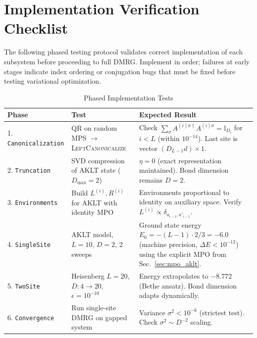 \documentclass[aps,prb,onecolumn,scriptaddress]{revtex4-2}
\newcommand{\eps}{\epsilon}
\begin{document}
	\section{Implementation Verification Checklist}
	\label{sec:verification}
	
	The following phased testing protocol validates correct implementation of each subsystem before proceeding to full DMRG. Implement in order; failures at early stages indicate index ordering or conjugation bugs that must be fixed before testing variational optimization.
	
	\begin{table}[htbp]
		\centering
		\caption{Phased Implementation Tests}
		\label{tab:verification}
		\begin{tabularx}{\textwidth}{@{}l>{\raggedright\arraybackslash}p{3.5cm}X@{}}
			\toprule
			\textbf{Phase} & \textbf{Test} & \textbf{Expected Result} \\
			\midrule
			1. \texttt{Canonicalization} & 
			QR on random MPS $\to$ \textsc{LeftCanonicalize} & 
			Check $\sum_\sigma A^{(i)\sigma\dagger} A^{(i)\sigma} = \mathbb{I}_{D_i}$ for $i<L$ (within $10^{-14}$). Last site is vector $(D_{L-1}d) \times 1$. \\
			\midrule
			2. \texttt{Truncation} & 
			SVD compression of AKLT state ($D_{\max}=2$) & 
			$\eta = 0$ (exact representation maintained). Bond dimension remains $D=2$. \\
			\midrule
			3. \texttt{Environments} & 
			Build $L^{(i)}, R^{(i)}$ for AKLT with identity MPO & 
			Environments proportional to identity on auxiliary space. Verify $L^{(i)} \propto \delta_{a_{i-1},a'_{i-1}}$. \\
			\midrule
			4. \texttt{SingleSite} & 
			AKLT model, $L=10$, $D=2$, 2 sweeps & 
			Ground state energy $E_0 = -(L-1) \cdot 2/3 = -6.0$ (machine precision, $\Delta E < 10^{-12}$) using the explicit MPO from Sec.~\ref{sec:mpo_aklt}. \\
			\midrule
			5. \texttt{TwoSite} & 
			Heisenberg $L=20$, $D: 4\to20$, $\eps=10^{-10}$ & 
			Energy extrapolates to $-8.772$ (Bethe ansatz). Bond dimension adapts dynamically. \\
			\midrule
			6. \texttt{Convergence} & 
			Run single-site DMRG on gapped system & 
			Variance $\sigma^2 < 10^{-6}$ (strictest test). Check $\sigma^2 \sim D^{-2}$ scaling. \\
			\bottomrule
		\end{tabularx}
	\end{table}
	
\end{document}
